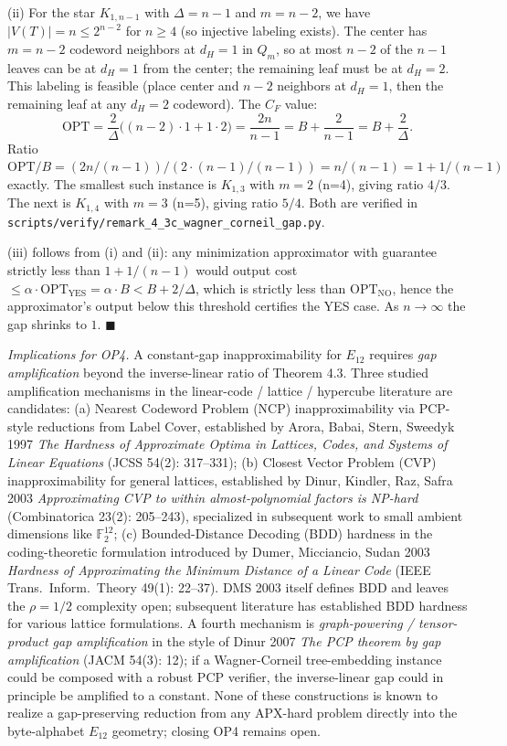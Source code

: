 \documentclass[
]{article}
\begin{document}
(ii) For the star $K_{1, n-1}$ with $\Delta = n - 1$ and $m = n - 2$,
we have $|V(T)| = n \leq 2^{n-2}$ for $n \geq 4$ (so injective
labeling exists). The center has $m = n - 2$ codeword neighbors at
$d_H = 1$ in $Q_m$, so at most $n - 2$ of the $n - 1$ leaves can be
at $d_H = 1$ from the center; the remaining leaf must be at $d_H = 2$.
This labeling is feasible (place center and $n - 2$ neighbors at
$d_H = 1$, then the remaining leaf at any $d_H = 2$ codeword). The
$C_F$ value:
\[
\mathrm{OPT} = \frac{2}{\Delta} \bigl((n - 2) \cdot 1 + 1 \cdot 2\bigr)
= \frac{2n}{n - 1} = B + \frac{2}{n - 1} = B + \frac{2}{\Delta}.
\]
Ratio $\mathrm{OPT} / B = (2n / (n-1)) / (2 \cdot (n-1) / (n-1)) =
n / (n - 1) = 1 + 1/(n-1)$ exactly. The smallest such instance is
$K_{1, 3}$ with $m = 2$ (n=4), giving ratio $4/3$. The next is
$K_{1, 4}$ with $m = 3$ (n=5), giving ratio $5/4$. Both are verified
in \texttt{scripts/verify/remark\_4\_3c\_wagner\_corneil\_gap.py}.

(iii) follows from (i) and (ii): any minimization approximator with
guarantee strictly less than $1 + 1/(n-1)$ would output cost
$\leq \alpha \cdot \mathrm{OPT}_{\mathrm{YES}} = \alpha \cdot B
< B + 2/\Delta$, which is strictly less than $\mathrm{OPT}_{\mathrm{NO}}$,
hence the approximator's output below this threshold certifies the
YES case. As $n \to \infty$ the gap shrinks to $1$. \hfill$\blacksquare$

\emph{Implications for OP4.} A constant-gap inapproximability for
$E_{12}$ requires \emph{gap amplification} beyond the inverse-linear
ratio of Theorem 4.3. Three studied amplification mechanisms in the
linear-code / lattice / hypercube literature are candidates:
(a) Nearest Codeword Problem (NCP) inapproximability via PCP-style
reductions from Label Cover, established by
Arora, Babai, Stern, Sweedyk 1997 \emph{The Hardness of Approximate
Optima in Lattices, Codes, and Systems of Linear Equations}
(JCSS 54(2): 317--331);
(b) Closest Vector Problem (CVP) inapproximability for general
lattices, established by Dinur, Kindler, Raz, Safra 2003
\emph{Approximating CVP to within almost-polynomial factors is
NP-hard} (Combinatorica 23(2): 205--243), specialized in subsequent
work to small ambient dimensions like $\mathbb{F}_2^{12}$;
(c) Bounded-Distance Decoding (BDD) hardness in the coding-theoretic
formulation introduced by Dumer, Micciancio, Sudan 2003
\emph{Hardness of Approximating the Minimum Distance of a Linear
Code} (IEEE Trans.\ Inform.\ Theory 49(1): 22--37). DMS 2003 itself
defines BDD and leaves the $\rho = 1/2$ complexity open; subsequent
literature has established BDD hardness for various lattice
formulations.
A fourth mechanism is \emph{graph-powering / tensor-product
gap amplification} in the style of Dinur 2007 \emph{The PCP theorem
by gap amplification} (JACM 54(3): 12); if a Wagner-Corneil
tree-embedding instance could be composed with a robust PCP
verifier, the inverse-linear gap could in principle be amplified to
a constant. None of these constructions is known to realize a
gap-preserving reduction from any APX-hard problem directly into
the byte-alphabet $E_{12}$ geometry; closing OP4 remains open.
\end{document}
